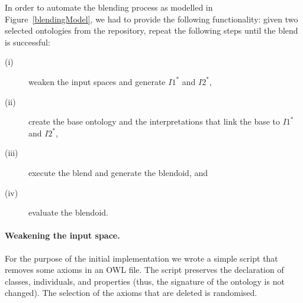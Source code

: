 \documentclass[letterpaper]{article}
\begin{document}
In order to automate the blending process as modelled in Figure~\ref{blendingModel}, 
we had to  provide the following functionality: given two selected ontologies from the 
repository, repeat the following steps until the blend is successful: 

\begin{description}
	\item[(i)] weaken the input spaces and generate $I1^*$ and $I2^*$, 
	\item[(ii)] create the base ontology and the  interpretations that link the base to $I1^*$ and $I2^*$,  
	\item[(iii)] execute the blend  and generate the blendoid, and
	\item[(iv)] evaluate the blendoid.  
\end{description}



\paragraph{Weakening the input space.} For the purpose of the initial implementation
 we wrote a simple script that removes some axioms in an OWL file.
  The script preserves the declaration of classes, individuals, and properties
   (thus, the signature of the ontology is not changed). 
   The selection of the axioms that are deleted is randomised.
\end{document}
